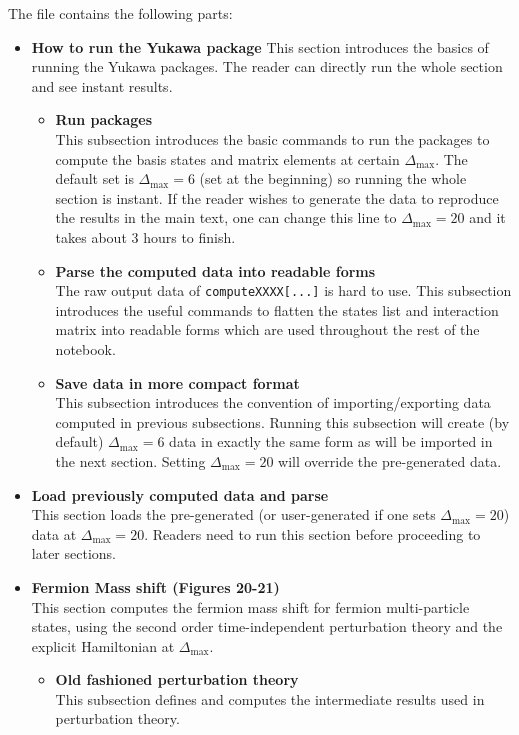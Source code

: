 \documentclass[12pt]{article}
\newcommand\De\Delta
\newcommand{\Dmax}{\De_{\max}}
\begin{document}
The file contains the following parts:
\begin{itemize}
\item \textbf{How to run the Yukawa package} \newline
This section introduces the basics of running the Yukawa packages. The reader can directly run the whole section and see instant results.
  \begin{itemize}
  \item \textbf{Run packages}\\
  This subsection introduces the basic commands to run the packages to compute the basis states and matrix elements at certain $\Dmax$. The default set is $\Dmax=6$ (set at the beginning) so running the whole section is instant. If the reader wishes to generate the data to reproduce the results in the main text, one can change this line to $\Dmax=20$ and it takes about 3 hours to finish.
  \item \textbf{Parse the computed data into readable forms}\\
  The raw output data of {\tt computeXXXX[...]} is hard to use. This subsection introduces the useful commands to flatten the states list and interaction matrix into readable forms which are used throughout the rest of the notebook.
  \item \textbf{Save data in more compact format}\\
  This subsection introduces the convention of importing/exporting data computed in previous subsections. Running this subsection will create (by default) $\Dmax=6$ data in exactly the same form as will be imported in the next section. Setting $\Dmax=20$ will override the pre-generated data.
  \end{itemize}
\item \textbf{Load previously computed data and parse}\\
This section loads the pre-generated (or user-generated if one sets $\Dmax=20$) data at $\Dmax=20$. Readers need to run this section before proceeding to later sections.
\item \textbf{Fermion Mass shift (Figures 20-21)}\\
This section computes the fermion mass shift for fermion multi-particle states, using the second order time-independent perturbation theory and the explicit Hamiltonian at $\Dmax$.
  \begin{itemize}
  \item \textbf{Old fashioned perturbation theory}\\
  This subsection defines and computes the intermediate results used in perturbation theory. 

\end{itemize}
\end{itemize}
\end{document}

